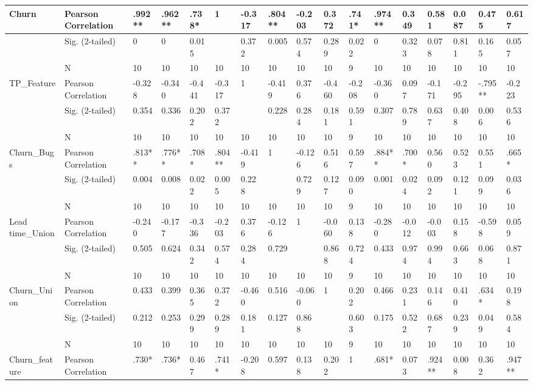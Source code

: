 \documentclass[UKenglish]{ifimaster}  %
\begin{document}
\begin{table}[htbp]
\begin{adjustwidth}{-2cm}{}
{\begin{tabular}{ | l | l | l | l | l | l | l | l | l | l | l | l | l | l | l | l | l | }
	Churn & Pearson Correlation & .992** & .962** & .738* & 1 & -0.317 & .804** & -0.203 & 0.372 & .741* & .974** & 0.349 & 0.581 & 0.087 & 0.475 & 0.617\\ \hline
	 & Sig. (2-tailed) & 0 & 0 & 0.015 &  & 0.372 & 0.005 & 0.574 & 0.289 & 0.022 & 0 & 0.323 & 0.078 & 0.811 & 0.165 & 0.057\\ \hline
	 & N & 10 & 10 & 10 & 10 & 10 & 10 & 10 & 10 & 9 & 10 & 10 & 10 & 10 & 10 & 10 \\ \hline
	TP\_Feature & Pearson Correlation & -0.328 & -0.340 & -0.441 & -0.317 & 1 & -0.419 & 0.376 & -0.460 & -0.208 & -0.360 & 0.097 & -0.171 & -0.295 & -.795** & -0.223\\ \hline
	 & Sig. (2-tailed) & 0.354 & 0.336 & 0.202 & 0.372 &  & 0.228 & 0.284 & 0.181 & 0.591 & 0.307 & 0.789 & 0.637 & 0.408 & 0.006 & 0.536\\ \hline
	 & N & 10 & 10 & 10 & 10 & 10 & 10 & 10 & 10 & 9 & 10 & 10 & 10 & 10 & 10 & 10 \\ \hline
	Churn\_Bugs & Pearson Correlation & .813** & .776** & .708* & .804** & -0.419 & 1 & -0.126 & 0.516 & 0.597 & .884** & .700* & 0.560 & 0.523 & 0.551 & .665* \\ \hline
	 & Sig. (2-tailed) & 0.004 & 0.008 & 0.022 & 0.005 & 0.228 &  & 0.729 & 0.127 & 0.090 & 0.001 & 0.024 & 0.092 & 0.121 & 0.099 & 0.036\\ \hline
	 & N & 10 & 10 & 10 & 10 & 10 & 10 & 10 & 10 & 9 & 10 & 10 & 10 & 10 & 10 & 10 \\ \hline
	Lead time\_Union & Pearson Correlation & -0.240 & -0.177 & -0.336 & -0.203 & 0.376 & -0.126 & 1 & -0.060 & 0.138 & -0.280 & -0.012 & -0.003 & 0.158 & -0.598 & 0.059\\ \hline
	 & Sig. (2-tailed) & 0.505 & 0.624 & 0.342 & 0.574 & 0.284 & 0.729 &  & 0.868 & 0.724 & 0.433 & 0.974 & 0.994 & 0.663 & 0.068 & 0.871\\ \hline
	 & N & 10 & 10 & 10 & 10 & 10 & 10 & 10 & 10 & 9 & 10 & 10 & 10 & 10 & 10 & 10 \\ \hline
	Churn\_Union & Pearson Correlation & 0.433 & 0.399 & 0.365 & 0.372 & -0.460 & 0.516 & -0.060 & 1 & 0.202 & 0.466 & 0.231 & 0.146 & 0.410 & .634* & 0.198\\ \hline
	 & Sig. (2-tailed) & 0.212 & 0.253 & 0.299 & 0.289 & 0.181 & 0.127 & 0.868 &  & 0.603 & 0.175 & 0.522 & 0.687 & 0.239 & 0.049 & 0.584\\ \hline
	 & N & 10 & 10 & 10 & 10 & 10 & 10 & 10 & 10 & 9 & 10 & 10 & 10 & 10 & 10 & 10 \\ \hline
	Churn\_feature & Pearson Correlation & .730* & .736* & 0.467 & .741* & -0.208 & 0.597 & 0.138 & 0.202 & 1 & .681* & 0.073 & .924** & 0.008 & 0.362 & .947** \\ \hline

\end{tabular}}
\end{adjustwidth}
\end{table}
\end{document}
